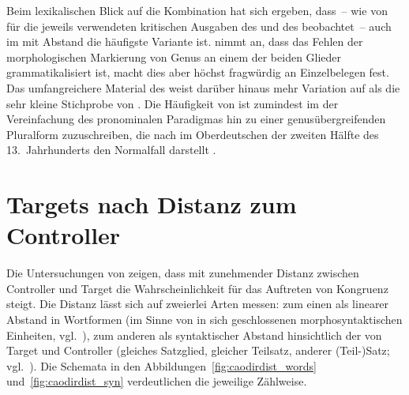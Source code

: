Beim lexikalischen Blick auf die Kombination  hat sich ergeben,
dass~-- wie von \citet{askedal1973} für die jeweils verwendeten kritischen
Ausgaben des  und des  beobachtet~-- auch im
\CAO{} mit Abstand die häufigste Variante  ist.
\citeauthor{askedal1973} nimmt an, dass das Fehlen der morphologischen
Markierung von Genus an einem der beiden Glieder
grammatikalisiert ist, macht dies aber höchst
fragwürdig an Einzelbelegen fest. Das umfangreichere Material des \CAO{} weist
darüber hinaus mehr Variation auf als die sehr kleine Stichprobe von
\citeauthor{askedal1973}. Die Häufigkeit von  
ist zumindest im \CAO{} der Vereinfachung des pronominalen
Paradigmas hin zu einer genusübergreifenden
Pluralform zuzuschreiben, die nach
\citet[391--392]{ksw2} im Oberdeutschen der zweiten Hälfte des
13.~Jahrhunderts den Normalfall darstellt \autocite[vgl.\
auch][37--39]{sparmann1961}.



\section{Targets nach Distanz zum Controller}
\label{sec:caotargdist}


Die Untersuchungen von \citet{corbett1979} zeigen, dass mit zunehmender Distanz
zwischen Controller und Target die Wahrscheinlichkeit für das Auftreten von
Kongruenz \fw{ad sensum} steigt. Die Distanz lässt sich auf zweierlei Arten
messen: zum einen als linearer Abstand in Wortformen\is{Distanz!lineare} (im
Sinne von in sich geschlossenen morphosyntaktischen Einheiten,
vgl.~\cite[252--253]{bauer2000}), zum anderen als syntaktischer
Abstand hinsichtlich der  von
Target und Controller (gleiches Satzglied, gleicher Teilsatz, anderer
(Teil-)Satz; vgl.~\sectref{sec:ctrltarg}). Die Schemata in den
Abbildungen~\ref{fig:caodirdist_words} und~\ref{fig:caodirdist_syn}
verdeutlichen die jeweilige Zählweise.

